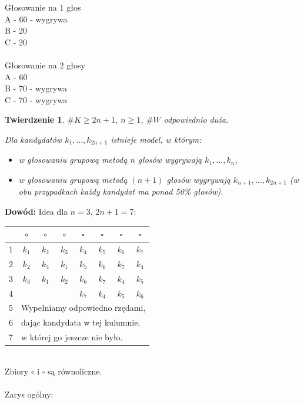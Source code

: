 \documentclass[12pt,a4paper]{article}
\theoremstyle{break}
\newtheorem{theorem}{Twierdzenie}[section]
\begin{document}
	Głosowanie na 1 głos\\
	A - 60 - wygrywa\\
	B - 20\\
	C - 20\\\\
	
	Głosowanie na 2 głosy\\
	A - 60\\
	B - 70 - wygrywa\\
	C - 70 - wygrywa
	
	
	\begin{theorem}
		$\# K \geq 2n+1$, $n \geq 1$, $\# W$ odpowiednio duża.
		
		Dla kandydatów $k_1, \dots, k_{2n+1}$ istnieje model, w którym:
		\begin{itemize}
			\item w głosowaniu grupową metodą $n$ głosów wygrywają $k_1, \dots, k_n$,
			\item w głosowaniu grupową metodą $(n+1)$ głosów wygrywają $k_{n+1}, \dots, k_{2n+1}$ (w obu przypadkach każdy kandydat ma ponad 50\% głosów).
		\end{itemize}
	\end{theorem}
	
	\noindent \textbf{Dowód:} Idea dla $n = 3$, $2n+1 = 7$:
	
	\begin{tabular}{|c|ccc|cccc|}\hline
		&$\circ$&$\circ$&$\circ$&$\square$&$\square$&$\square$&$\square$\\\hline
		1&$k_1$&$k_2$&$k_3$&$k_4$&$k_5$&$k_6$&$k_7$\\
		2&$k_2$&$k_3$&$k_1$&$k_5$&$k_6$&$k_7$&$k_4$\\
		3&$k_3$&$k_1$&$k_2$&$k_6$&$k_7$&$k_4$&$k_5$\\\hline
		4&&&&$k_7$&$k_4$&$k_5$&$k_6$\\\hline
		5&\multicolumn{7}{|l|}{Wypełniamy odpowiedno rzędami,}\\
		6&\multicolumn{7}{|l|}{dając kandydata w tej kulumnie,}\\
		7&\multicolumn{7}{|l|}{w której go jeszcze nie było.}\\\hline
	\end{tabular}\\

	Zbiory $\circ$ i $\square$ są równoliczne.\\\\
	
	Zarys ogólny:
	
\end{document}
